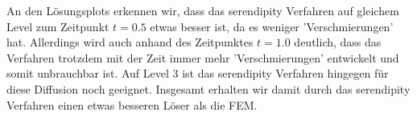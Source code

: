 \begin{figure}[H]
	\centering
\end{figure}

An den Lösungsplots erkennen wir, dass das serendipity Verfahren auf gleichem Level zum Zeitpunkt $t=0.5$ etwas besser ist, da es weniger 'Verschmierungen' hat. Allerdings wird auch anhand des Zeitpunktes $t=1.0$ deutlich, dass das Verfahren trotzdem mit der Zeit immer mehr 'Verschmierungen' entwickelt und somit unbrauchbar ist.
Auf Level 3 ist das serendipity Verfahren hingegen für diese Diffusion noch geeignet. Insgesamt erhalten wir damit durch das serendipity Verfahren einen etwas besseren Löser als die FEM.



